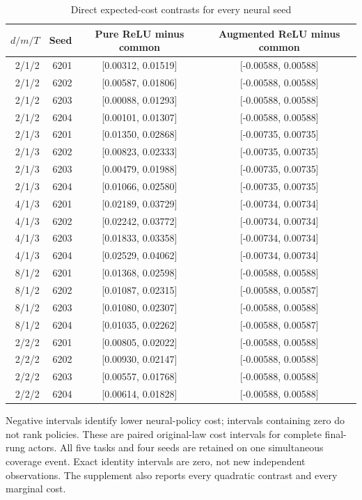 \begin{table}[htbp]
\centering
\caption{Direct expected-cost contrasts for every neural seed}\label{tab:comparisons62}
{\small\setlength{\tabcolsep}{3pt}
\begin{tabular}{rrcc}
\hline
$d/m/T$ & Seed & Pure ReLU minus common & Augmented ReLU minus common \\
\hline
2/1/2 & 6201 & [0.00312, 0.01519] & [-0.00588, 0.00588] \\
2/1/2 & 6202 & [0.00587, 0.01806] & [-0.00588, 0.00588] \\
2/1/2 & 6203 & [0.00088, 0.01293] & [-0.00588, 0.00588] \\
2/1/2 & 6204 & [0.00101, 0.01307] & [-0.00588, 0.00588] \\
2/1/3 & 6201 & [0.01350, 0.02868] & [-0.00735, 0.00735] \\
2/1/3 & 6202 & [0.00823, 0.02333] & [-0.00735, 0.00735] \\
2/1/3 & 6203 & [0.00479, 0.01988] & [-0.00735, 0.00735] \\
2/1/3 & 6204 & [0.01066, 0.02580] & [-0.00735, 0.00735] \\
4/1/3 & 6201 & [0.02189, 0.03729] & [-0.00734, 0.00734] \\
4/1/3 & 6202 & [0.02242, 0.03772] & [-0.00734, 0.00734] \\
4/1/3 & 6203 & [0.01833, 0.03358] & [-0.00734, 0.00734] \\
4/1/3 & 6204 & [0.02529, 0.04062] & [-0.00734, 0.00734] \\
8/1/2 & 6201 & [0.01368, 0.02598] & [-0.00588, 0.00588] \\
8/1/2 & 6202 & [0.01087, 0.02315] & [-0.00588, 0.00587] \\
8/1/2 & 6203 & [0.01080, 0.02307] & [-0.00588, 0.00588] \\
8/1/2 & 6204 & [0.01035, 0.02262] & [-0.00588, 0.00587] \\
2/2/2 & 6201 & [0.00805, 0.02022] & [-0.00588, 0.00588] \\
2/2/2 & 6202 & [0.00930, 0.02147] & [-0.00588, 0.00588] \\
2/2/2 & 6203 & [0.00557, 0.01768] & [-0.00588, 0.00588] \\
2/2/2 & 6204 & [0.00614, 0.01828] & [-0.00588, 0.00588] \\
\hline
\end{tabular}}
\par\smallskip
{\footnotesize Negative intervals identify lower neural-policy cost; intervals containing zero do not rank policies. These are paired original-law cost intervals for complete final-rung actors. All five tasks and four seeds are retained on one simultaneous coverage event. Exact identity intervals are zero, not new independent observations. The supplement also reports every quadratic contrast and every marginal cost.}
\end{table}
